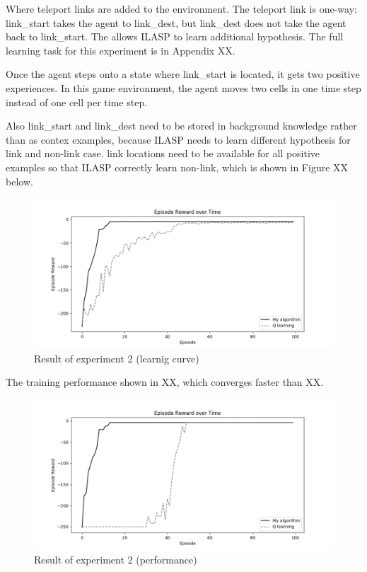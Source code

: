 Where teleport links are added to the environment. The teleport link is one-way: link\_start takes the agent to link\_dest, but link\_dest does not take the agent back to link\_start.
The allows ILASP to learn additional hypothesis.
The full learning task for this experiment is in Appendix XX.

Once the agent steps onto a state where link\_start is located, it gets two positive experiences.
In this game environment, the agent moves two cells in one time step instead of one cell per time step.

Also link\_start and link\_dest need to be stored in background knowledge rather than as contex examples,
because ILASP needs to learn different hypothesis for link and non-link case.
link locations need to be available for all positive examples so that ILASP correctly learn non-link, which is shown in Figure XX below.

\begin{figure}[!htb]
\centering
\includegraphics[width=1.0\textwidth]{./figures/experiment3_training}
\caption{Result of experiment 2 (learnig curve)}
\label{experiment3_training}
\end{figure}

The training performance shown in XX, which converges faster than XX.

\begin{figure}[!htb]
\centering
\includegraphics[width=1.0\textwidth]{./figures/experiment3_test}
\caption{Result of experiment 2 (performance)}
\label{experiment3_test}
\end{figure}

